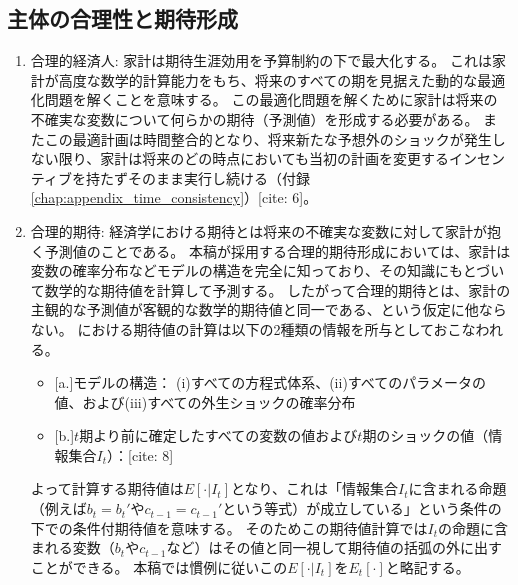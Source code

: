 
\subsection{主体の合理性と期待形成}
\label{sec:chapter3_assumptions_behavior}

\begin{enumerate}
    \item
    \label{sec:chapter3_assumptions_behavior_homo_economicus}
        合理的経済人:
        家計は期待生涯効用を予算制約の下で最大化する。
        これは家計が高度な数学的計算能力をもち、将来のすべての期を見据えた動的な最適化問題を解くことを意味する。
        この最適化問題を解くために家計は将来の不確実な変数について何らかの期待（予測値）を形成する必要がある。
        またこの最適計画は時間整合的となり、将来新たな予想外のショックが発生しない限り、家計は将来のどの時点においても当初の計画を変更するインセンティブを持たずそのまま実行し続ける（付録\ref{chap:appendix_time_consistency}）[cite: 6]。
    \item
    \label{sec:chapter3_assumptions_behavior_rational_expectations}
        合理的期待:
        経済学における期待とは将来の不確実な変数に対して家計が抱く予測値のことである。
        本稿が採用する合理的期待形成においては、家計は変数の確率分布などモデルの構造を完全に知っており、その知識にもとづいて数学的な期待値を計算して予測する。
        したがって合理的期待とは、家計の主観的な予測値が客観的な数学的期待値と同一である、という仮定に他ならない。
        における期待値の計算は以下の2種類の情報を所与としておこなわれる。
        \begin{itemize}
            \item
            \label{sec:chapter3_assumptions_behavior_model_structure}
                [a.]モデルの構造：
                (i)すべての方程式体系、(ii)すべてのパラメータの値、および(iii)すべての外生ショックの確率分布
            \item
            \label{sec:chapter3_assumptions_behavior_information_set}
                [b.]\(t\)期より前に確定したすべての変数の値および\(t\)期のショックの値（情報集合\(I_t\)）：[cite: 8]
        \end{itemize}
        よって計算する期待値は\(E[\cdot|I_t]\)となり、これは「情報集合\(I_t\)に含まれる命題（例えば\(b_t=b_t'\)や\(c_{t-1}=c_{t-1}'\)という等式）が成立している」という条件の下での条件付期待値を意味する。
        そのためこの期待値計算では\(I_t\)の命題に含まれる変数（\(b_t\)や\(c_{t-1}\)など）はその値と同一視して期待値の括弧の外に出すことができる。
        本稿では慣例に従いこの\(E[\cdot|I_t]\)を\(E_t[\cdot]\)と略記する。
\end{enumerate}